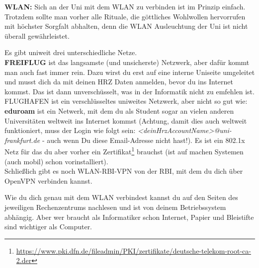 \textbf{WLAN:}
Sich an der Uni mit dem WLAN zu verbinden ist im Prinzip einfach.
Trotzdem sollte man vorher alle Rituale, die g\"ottliches Wohlwollen hervorrufen mit h\"ochster Sorgfalt abhalten,
denn die WLAN Ausleuchtung der Uni ist nicht \"uberall gew\"ahrleistet.

Es gibt uniweit drei unterschiedliche Netze.\\
\textbf{FREIFLUG} ist das langsamste (und unsicherste) Netzwerk, aber daf\"ur kommt man auch fast immer rein. Dazu wirst du erst auf eine interne Uniseite umgeleitet und musst dich da mit deinen HRZ Daten anmelden, bevor du ins Internet kommst. Das ist dann unversch\"usselt, was in der Informatik nicht zu emfehlen ist.\\
FLUGHAFEN ist ein verschl\"usseltes uniweites Netzwerk, aber nicht so gut wie:\\
\textbf{eduroam} ist ein Netwerk, mit dem du als Student sogar an vielen anderen Universit\"aten weltweit ins Internet kommst (Achtung, damit dies auch weltweit funktioniert, muss der Login wie folgt sein: \textit{<deinHrzAccountName>@uni-frankfurt.de} - auch wenn Du diese Email-Adresse nicht hast!).
Es ist ein 802.1x Netz f\"ur das du aber vorher ein Zertifikat\footnote{\url{https://www.pki.dfn.de/fileadmin/PKI/zertifikate/deutsche-telekom-root-ca-2.der}} brauchst (ist auf machen Systemen (auch mobil) schon vorinstalliert).\\
Schlie{\ss}lich gibt es noch WLAN-RBI-VPN von der RBI, mit dem du dich \"uber OpenVPN verbinden kannst.

Wie du dich genau mit dem WLAN verbindest kannst du auf den Seiten des jeweiligen Rechenzentrums nachlesen und ist von deinem Betriebssystem abh\"angig. Aber wer braucht als Informatiker schon Internet, Papier und Bleistifte sind wichtiger als Computer.






\spaltenende
